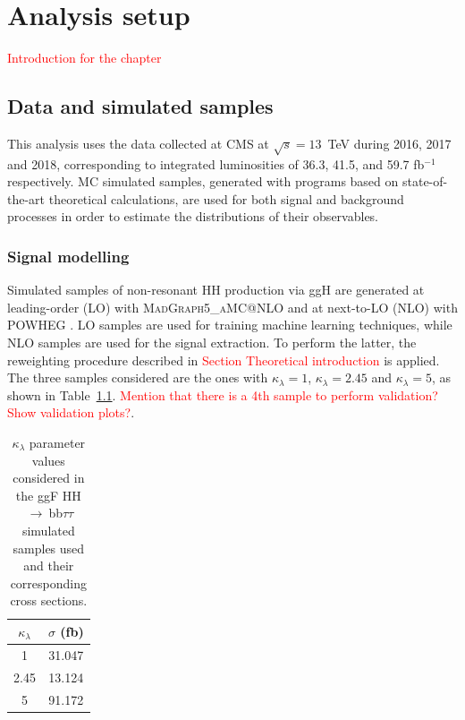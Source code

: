 \documentclass[../main.tex]{subfiles}
\begin{document}
\chapter{Analysis setup}

\textcolor{red}{Introduction for the chapter}

\label{hh:chapter:analysis}

\section{Data and simulated samples}

This analysis uses the data collected at CMS at $\sqrt{s}=13$~TeV during 2016, 2017 and 2018, corresponding to integrated luminosities of 36.3, 41.5, and 59.7 fb${}^{-1}$ respectively. MC simulated samples, generated with programs based on state-of-the-art theoretical calculations, are used for both signal and background processes in order to estimate the distributions of their observables.

\subsection{Signal modelling}

Simulated samples of non-resonant HH production via ggH are generated at leading-order (LO) with 
\textsc{MadGraph5\_aMC@NLO} \cite{hh:analysis:madgraph} and at next-to-LO (NLO) with \textsc{POWHEG} \cite{hh:analysis:powheg}. LO samples are used for training machine learning techniques, while NLO samples are used for the signal extraction. To perform the latter, the reweighting procedure described in \textcolor{red}{Section Theoretical introduction} is applied. The three samples considered are the ones with $\kappa_\lambda = 1$, $\kappa_\lambda = 2.45$ and $\kappa_\lambda = 5$, as shown in Table~\ref{hh:analysis:ggf_samples}. \textcolor{red}{Mention that there is a 4th sample to perform validation? Show validation plots?}.


\begin{table}[h!]
\begin{center}
\begin{tabular}{c | c}
$\kappa_\lambda$ & $\sigma$ (fb) \\ \hline
1    & 31.047 \\
2.45 & 13.124 \\
5    & 91.172
\end{tabular}
\caption{$\kappa_\lambda$ parameter values considered in the ggF HH$~\to~$bb$\tau\tau$ simulated samples used and their corresponding cross sections.}
\label{hh:analysis:ggf_samples}
\end{center}
\end{table}
\end{document}
